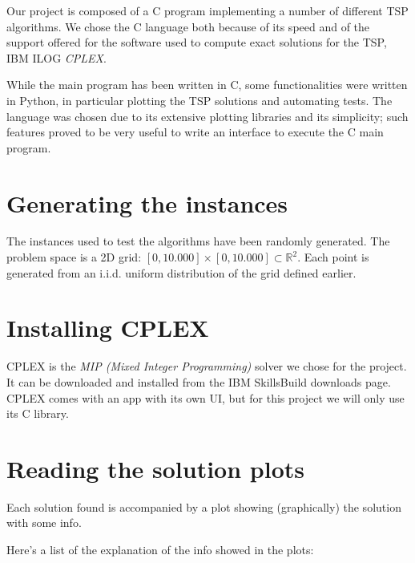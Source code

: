 Our project is composed of a C program implementing a number of different TSP algorithms. We chose the C language both because of its speed and of the support offered for the software used to compute exact solutions for the TSP, IBM ILOG \textit{CPLEX}.

While the main program has been written in C, some functionalities were written in Python, in particular plotting the TSP solutions and automating tests. The language was chosen due to its extensive plotting libraries and its simplicity; such features proved to be very useful to write an interface to execute the C main program.

\section{Generating the instances}

The instances used to test the algorithms have been randomly generated. The problem space is a 2D grid: $[0,10.000]\times[0,10.000]\subset\mathbb{R}^2$. Each point is generated from an i.i.d. uniform distribution of the grid defined earlier.

\section{Installing CPLEX}

CPLEX is the \textit{MIP (Mixed Integer Programming)} solver we chose for the project. It can be downloaded and installed from the IBM SkillsBuild downloads page. CPLEX comes with an app with its own UI, but for this project we will only use its C library. 

\section{Reading the solution plots}

Each solution found is accompanied by a plot showing (graphically) the solution with some info.

Here's a list of the explanation of the info showed in the plots:

